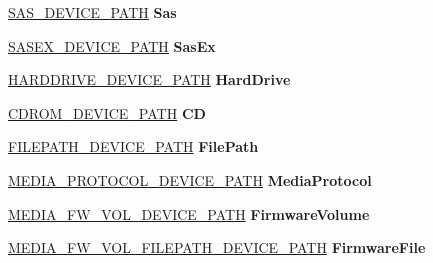 \begin{DoxyCompactItemize}
\hyperlink{struct_s_a_s___d_e_v_i_c_e___p_a_t_h}{S\+A\+S\+\_\+\+D\+E\+V\+I\+C\+E\+\_\+\+P\+A\+TH} {\bfseries Sas}
\item 
\mbox{\label{union_e_f_i___d_e_v___p_a_t_h_a0488092cfa4db306c092a7e2ec3e33d6}} 
\hyperlink{struct_s_a_s_e_x___d_e_v_i_c_e___p_a_t_h}{S\+A\+S\+E\+X\+\_\+\+D\+E\+V\+I\+C\+E\+\_\+\+P\+A\+TH} {\bfseries Sas\+Ex}
\item 
\mbox{\label{union_e_f_i___d_e_v___p_a_t_h_a7894698ef8da712905c6548dbe5277f4}} 
\hyperlink{struct_h_a_r_d_d_r_i_v_e___d_e_v_i_c_e___p_a_t_h}{H\+A\+R\+D\+D\+R\+I\+V\+E\+\_\+\+D\+E\+V\+I\+C\+E\+\_\+\+P\+A\+TH} {\bfseries Hard\+Drive}
\item 
\mbox{\label{union_e_f_i___d_e_v___p_a_t_h_a81182e8179bd9d02588aa951f3877ffe}} 
\hyperlink{struct_c_d_r_o_m___d_e_v_i_c_e___p_a_t_h}{C\+D\+R\+O\+M\+\_\+\+D\+E\+V\+I\+C\+E\+\_\+\+P\+A\+TH} {\bfseries CD}
\item 
\mbox{\label{union_e_f_i___d_e_v___p_a_t_h_a92dec1278833b7a83915b407daaf585a}} 
\hyperlink{struct_f_i_l_e_p_a_t_h___d_e_v_i_c_e___p_a_t_h}{F\+I\+L\+E\+P\+A\+T\+H\+\_\+\+D\+E\+V\+I\+C\+E\+\_\+\+P\+A\+TH} {\bfseries File\+Path}
\item 
\mbox{\label{union_e_f_i___d_e_v___p_a_t_h_a777261c329be5fa74135370d2984aac4}} 
\hyperlink{struct_m_e_d_i_a___p_r_o_t_o_c_o_l___d_e_v_i_c_e___p_a_t_h}{M\+E\+D\+I\+A\+\_\+\+P\+R\+O\+T\+O\+C\+O\+L\+\_\+\+D\+E\+V\+I\+C\+E\+\_\+\+P\+A\+TH} {\bfseries Media\+Protocol}
\item 
\mbox{\label{union_e_f_i___d_e_v___p_a_t_h_aa929c804827364182450d9e850bdd6b7}} 
\hyperlink{struct_m_e_d_i_a___f_w___v_o_l___d_e_v_i_c_e___p_a_t_h}{M\+E\+D\+I\+A\+\_\+\+F\+W\+\_\+\+V\+O\+L\+\_\+\+D\+E\+V\+I\+C\+E\+\_\+\+P\+A\+TH} {\bfseries Firmware\+Volume}
\item 
\mbox{\label{union_e_f_i___d_e_v___p_a_t_h_abc6d302a25943bca804cccd4d4740359}} 
\hyperlink{struct_m_e_d_i_a___f_w___v_o_l___f_i_l_e_p_a_t_h___d_e_v_i_c_e___p_a_t_h}{M\+E\+D\+I\+A\+\_\+\+F\+W\+\_\+\+V\+O\+L\+\_\+\+F\+I\+L\+E\+P\+A\+T\+H\+\_\+\+D\+E\+V\+I\+C\+E\+\_\+\+P\+A\+TH} {\bfseries Firmware\+File}

\end{DoxyCompactItemize}
